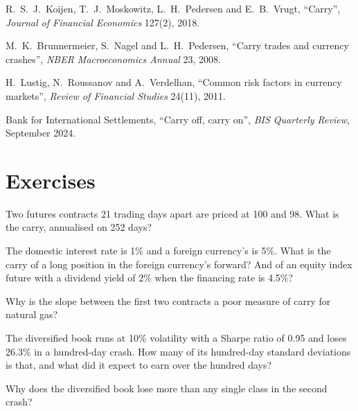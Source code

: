 \begin{omsources}
\item R.~S.~J.~Koijen, T.~J.~Moskowitz, L.~H.~Pedersen and E.~B.~Vrugt, ``Carry'', \emph{Journal of Financial Economics} 127(2), 2018.
\item M.~K.~Brunnermeier, S.~Nagel and L.~H.~Pedersen, ``Carry trades and currency crashes'', \emph{NBER Macroeconomics Annual} 23, 2008.
\item H.~Lustig, N.~Roussanov and A.~Verdelhan, ``Common risk factors in currency markets'', \emph{Review of Financial Studies} 24(11), 2011.
\item Bank for International Settlements, ``Carry off, carry on'', \emph{BIS Quarterly Review}, September 2024.
\end{omsources}

\section{Exercises}

\begin{exercise}[$\star$]\label{exo:s1:carry-across-asset-classes:1}
Two futures contracts 21 trading days apart are priced at 100 and 98. What is the carry, annualised on 252 days?
\end{exercise}

\begin{exercise}[$\star$]\label{exo:s1:carry-across-asset-classes:2}
The domestic interest rate is 1\% and a foreign currency's is 5\%. What is the carry of a long position in the foreign currency's forward? And of an
equity index future with a dividend yield of 2\% when the financing rate is 4.5\%?
\end{exercise}

\begin{exercise}[$\star$]\label{exo:s1:carry-across-asset-classes:3}
Why is the slope between the first two contracts a poor measure of carry for natural gas?
\end{exercise}

\begin{exercise}[$\star\star$]\label{exo:s1:carry-across-asset-classes:4}
The diversified book runs at 10\% volatility with a Sharpe ratio of 0.95 and loses 26.3\% in a hundred-day crash. How many of its hundred-day standard
deviations is that, and what did it expect to earn over the hundred days?
\end{exercise}

\begin{exercise}[$\star\star$]\label{exo:s1:carry-across-asset-classes:5}
Why does the diversified book lose more than any single class in the second crash?
\end{exercise}

